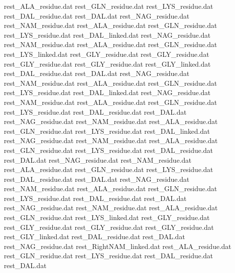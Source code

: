 rest_ALA_residue.dat            
rest_GLN_residue.dat            
rest_LYS_residue.dat            
rest_DAL_residue.dat            
rest_DAL.dat                    
rest_NAG_residue.dat            
rest_NAM_residue.dat            
rest_ALA_residue.dat            
rest_GLN_residue.dat            
rest_LYS_residue.dat            
rest_DAL_linked.dat             
rest_NAG_residue.dat            
rest_NAM_residue.dat            
rest_ALA_residue.dat            
rest_GLN_residue.dat            
rest_LYS_linked.dat             
rest_GLY_residue.dat
rest_GLY_residue.dat
rest_GLY_residue.dat
rest_GLY_residue.dat
rest_GLY_linked.dat
rest_DAL_residue.dat            
rest_DAL.dat                    
rest_NAG_residue.dat            
rest_NAM_residue.dat            
rest_ALA_residue.dat            
rest_GLN_residue.dat            
rest_LYS_residue.dat            
rest_DAL_linked.dat             
rest_NAG_residue.dat            
rest_NAM_residue.dat            
rest_ALA_residue.dat            
rest_GLN_residue.dat            
rest_LYS_residue.dat            
rest_DAL_residue.dat            
rest_DAL.dat                    
rest_NAG_residue.dat            
rest_NAM_residue.dat            
rest_ALA_residue.dat            
rest_GLN_residue.dat            
rest_LYS_residue.dat            
rest_DAL_linked.dat             
rest_NAG_residue.dat            
rest_NAM_residue.dat            
rest_ALA_residue.dat            
rest_GLN_residue.dat            
rest_LYS_residue.dat            
rest_DAL_residue.dat            
rest_DAL.dat                    
rest_NAG_residue.dat            
rest_NAM_residue.dat            
rest_ALA_residue.dat            
rest_GLN_residue.dat            
rest_LYS_residue.dat            
rest_DAL_residue.dat            
rest_DAL.dat                    
rest_NAG_residue.dat            
rest_NAM_residue.dat            
rest_ALA_residue.dat            
rest_GLN_residue.dat            
rest_LYS_residue.dat            
rest_DAL_residue.dat            
rest_DAL.dat                    
rest_NAG_residue.dat            
rest_NAM_residue.dat            
rest_ALA_residue.dat            
rest_GLN_residue.dat            
rest_LYS_linked.dat             
rest_GLY_residue.dat
rest_GLY_residue.dat
rest_GLY_residue.dat
rest_GLY_residue.dat
rest_GLY_linked.dat
rest_DAL_residue.dat            
rest_DAL.dat                    
rest_NAG_residue.dat            
rest_RightNAM_linked.dat        
rest_ALA_residue.dat            
rest_GLN_residue.dat            
rest_LYS_residue.dat            
rest_DAL_residue.dat            
rest_DAL.dat                    
